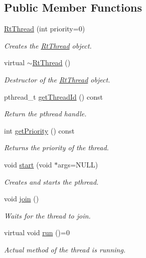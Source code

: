\subsection*{\-Public \-Member \-Functions}
\begin{DoxyCompactItemize}
\item 
\hyperlink{class_u_s_u_1_1_rt_thread_a9b72ca126bc7f53871ec78635540e037}{\-Rt\-Thread} (int priority=0)
\begin{DoxyCompactList}\small\item\em \-Creates the \hyperlink{class_u_s_u_1_1_rt_thread}{\-Rt\-Thread} object. \end{DoxyCompactList}\item 
virtual \hyperlink{class_u_s_u_1_1_rt_thread_ab1ec23dd67ba0d1ad0193416a1ed8243}{$\sim$\-Rt\-Thread} ()
\begin{DoxyCompactList}\small\item\em \-Destructor of the \hyperlink{class_u_s_u_1_1_rt_thread}{\-Rt\-Thread} object. \end{DoxyCompactList}\item 
pthread\-\_\-t \hyperlink{class_u_s_u_1_1_rt_thread_a8432c713bb9f0fca217d822970b3ec54}{get\-Thread\-Id} () const 
\begin{DoxyCompactList}\small\item\em \-Return the pthread handle. \end{DoxyCompactList}\item 
int \hyperlink{class_u_s_u_1_1_rt_thread_ac26891d04e6b5fc487d5325ca0c90ead}{get\-Priority} () const 
\begin{DoxyCompactList}\small\item\em \-Returns the priority of the thread. \end{DoxyCompactList}\item 
void \hyperlink{class_u_s_u_1_1_rt_thread_aadd18e02db9c71911671936247d0ac70}{start} (void $\ast$args=\-N\-U\-L\-L)
\begin{DoxyCompactList}\small\item\em \-Creates and starts the pthread. \end{DoxyCompactList}\item 
void \hyperlink{class_u_s_u_1_1_rt_thread_ae9ee3caaab9d46341c779ff67b27926d}{join} ()
\begin{DoxyCompactList}\small\item\em \-Waits for the thread to join. \end{DoxyCompactList}\item 
virtual void \hyperlink{class_u_s_u_1_1_rt_thread_a858a5d475ed5b61759889b6608ff4372}{run} ()=0
\begin{DoxyCompactList}\small\item\em \-Actual method of the thread is running. \end{DoxyCompactList}\end{DoxyCompactItemize}
